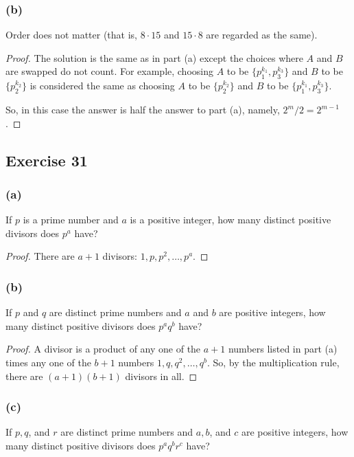 \documentclass[14pt]{extarticle}
\begin{document}
\subsubsection{(b)}
Order does not matter (that is, \(8 \cdot 15\) and \(15 \cdot 8\) are regarded as the same).

\begin{proof}
The solution is the same as in part (a) except the choices where $A$ and $B$ are swapped do not count. For example, 
choosing $A$ to be \(\{p_1^{k_1}, p_3^{k_3}\}\) and $B$ to be \(\{p_2^{k_2}\}\) is considered the same as choosing $A$ 
to be \(\{p_2^{k_2}\}\) and $B$ to be \(\{p_1^{k_1}, p_3^{k_3}\}\).

So, in this case the answer is half the answer to part (a), namely, \(2^m / 2 = 2^{m-1}\).
\end{proof}

\subsection{Exercise 31}
\subsubsection{(a)}
If $p$ is a prime number and $a$ is a positive integer, how many distinct positive divisors does $p^a$ have?

\begin{proof}
There are \(a + 1\) divisors: \(1, p, p^2, \ldots, p^a\).
\end{proof}

\subsubsection{(b)}
If $p$ and $q$ are distinct prime numbers and $a$ and $b$ are positive integers, how many distinct positive divisors 
does $p^a q^b$ have?

\begin{proof}
A divisor is a product of any one of the \(a + 1\) numbers listed in part (a) times any one of the \(b + 1\) numbers 
\(1, q, q^2, \ldots, q^b\). So, by the multiplication rule, there are \((a + 1)(b + 1)\) divisors in all.
\end{proof}

\subsubsection{(c)}
If $p, q$, and $r$ are distinct prime numbers and $a, b$, and $c$ are positive integers, how many distinct positive 
divisors does $p^a q^b r^c$ have?
\end{document}
